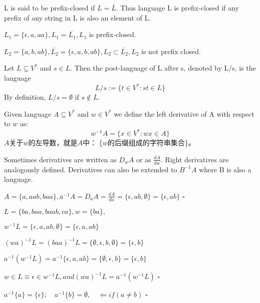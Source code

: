 L is said to be prefix-closed if $L = \overline{L}$. Thus language L is prefix-closed if any prefix of any string in L is also an element of L.

$L_1 = \{\epsilon,a,aa\}, L_1 = \overline{L_1}, L_{1}$ is prefix-closed.

$L_2 = \{a,b,ab\}, \overline{L_2} = \{\epsilon,a,b,ab\}, L_2 \subset \overline{L_2}, L_2$ is not prefix closed.

\hfill

\begin{definition}
Let $L\subseteq V^{\ast}$ and $s\in L$. Then the post-language of L after s, denoted by L/s, is the language
$$ L/s := \{t\in V^{\ast}:st\in L\}$$
By definition, $L/s = \emptyset$ if $s \notin \overline{L}$.
\end{definition}

\hfill

\begin{definition} Given language $A\subseteq V^{\ast}$ and $w\in V^{\ast}$ we define the left derivative of A with respect to $w$ as:
$$w^{-1}A = \{x\in V^{\ast}:wx\in A\}$$
$A$关于$w$的左导数，就是$A$中： \{$w$的后缀组成的字符串集合\}。

Sometimes derivatives are written as $D_{w}A$ or as $\frac{dA}{dw}$. Right derivatives are analogously defined. Derivatives can also be extended to $B^{-1}A$ where B is also a language.
\end{definition}

\begin{example}
$A = \{a,aab,baa\},a^{-1}A = D_{a}A = \frac{dA}{da} =\{\epsilon,ab,\emptyset\} = \{\epsilon,ab\}$ \hfill$\square$ 
\end{example}

\begin{example}
	$L = \{ba,baa,baab,ca\}, w = \{ba\},$
	
	$w^{-1}L =\{\epsilon,a,ab,\emptyset\} = \{\epsilon,a,ab\}$
	
	${(wa)}^{-1}L = {(baa)}^{-1}L = \{\emptyset,\epsilon,b,\emptyset\} = \{\epsilon,b\}$
	
	$a^{-1}(w^{-1}L) = a^{-1}\{\epsilon,a,ab\} = \{\emptyset,\epsilon,b\} = \{\epsilon,b\}$
	
	$w\in L \equiv \epsilon \in w^{-1}L,and {(wa)}^{-1}L = a^{-1}(w^{-1}L)$ \hfill$\square$ 
\end{example}

\begin{example}
	$a^{-1}\{a\} = \{\epsilon\}; \quad a^{-1}\{b\} = \emptyset,\quad\Leftarrow if (a\ne b)$ \hfill$\square$ 
\end{example}

